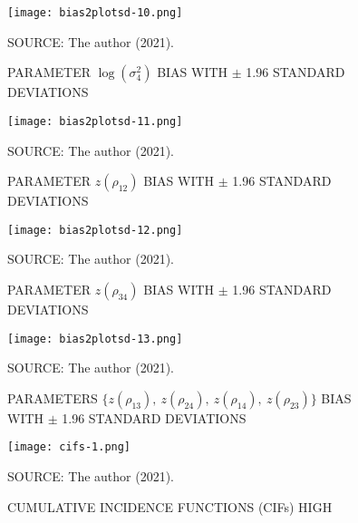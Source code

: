 \begin{figure}[H]
 \setlength{\abovecaptionskip}{.0001pt}
 \caption{PARAMETER \(\log(\sigma_{4}^{2})\) BIAS WITH \(\pm\) 1.96
          STANDARD DEVIATIONS}
 \vspace{0.2cm}\centering
 \texttt{[image: bias2plotsd-10.png]}\\
 \begin{footnotesize}
  SOURCE: The author (2021).
 \end{footnotesize}
 \label{fig:biassdlogs2_4}
\end{figure}

\begin{figure}[H]
 \setlength{\abovecaptionskip}{.0001pt}
 \caption{PARAMETER \(z(\rho_{12})\) BIAS WITH \(\pm\) 1.96 STANDARD
          DEVIATIONS}
 \vspace{0.2cm}\centering
 \texttt{[image: bias2plotsd-11.png]}\\
 \begin{footnotesize}
  SOURCE: The author (2021).
 \end{footnotesize}
 \label{fig:biassdrhoz12}
\end{figure}

\begin{figure}[H]
 \setlength{\abovecaptionskip}{.0001pt}
 \caption{PARAMETER \(z(\rho_{34})\) BIAS WITH \(\pm\) 1.96 STANDARD
          DEVIATIONS}
 \vspace{0.2cm}\centering
 \texttt{[image: bias2plotsd-12.png]}\\
 \begin{footnotesize}
  SOURCE: The author (2021).
 \end{footnotesize}
 \label{fig:biassdrhoz34}
\end{figure}

\begin{figure}[H]
 \setlength{\abovecaptionskip}{.0001pt}
 \caption{PARAMETERS
          \(\{z(\rho_{13}),~z(\rho_{24}),~z(\rho_{14}),~z(\rho_{23})\}\)
          BIAS WITH \(\pm\) 1.96 STANDARD DEVIATIONS}
 \vspace{0.2cm}\centering
 \texttt{[image: bias2plotsd-13.png]}\\
 \begin{footnotesize}
  SOURCE: The author (2021).
 \end{footnotesize}
 \label{fig:biassdrhoz4}
\end{figure}

\begin{figure}[H]
 \setlength{\abovecaptionskip}{.0001pt}
 \caption{CUMULATIVE INCIDENCE FUNCTIONS (CIFs) HIGH}
 \vspace{0.2cm}\centering
 \texttt{[image: cifs-1.png]}\\
 \begin{footnotesize}
  SOURCE: The author (2021).
 \end{footnotesize}
 \label{fig:cifshigh}
\end{figure}

